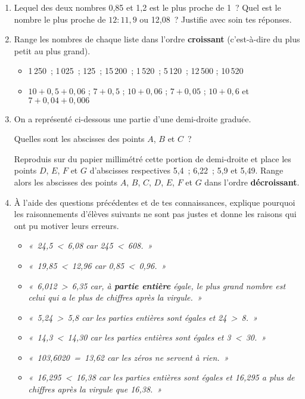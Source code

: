 

\begin{activite}

\begin{partie}
\begin{enumerate}
 \item Lequel des deux nombres 0,85 et 1,2 est le plus proche de 1 ? Quel est le nombre le plus proche de $12 : 11,9$ ou 12,08 ? Justifie avec soin tes réponses.
 \item Range les nombres de chaque liste dans l'ordre \textbf{croissant} (c'est-à-dire du plus petit au plus grand).
 	\begin{itemize}
	\item 1\,250 ; 1\,025 ; 125 ; 15\,200 ; 1\,520 ; 5\,120 ; 12\,500 ; 10\,520
	\item $10 + 0,5 + 0,06$ ; $7 + 0,5$ ; $10 + 0,06$ ; $7 + 0,05$ ; $10 + 0,6$ et $7 + 0,04 + 0,006$
	 \end{itemize}
 \item On a représenté ci-dessous une partie d'une demi-droite graduée.

Quelles sont les abscisses des points $A$, $B$ et $C$ ?

\vspace{0.75em}

Reproduis sur du papier millimétré cette portion de demi-droite et place les points $D$, $E$, $F$ et $G$ d'abscisses respectives 5,4 ; 6,22 ; 5,9 et 5,49.
Range alors les abscisses des points $A$, $B$, $C$, $D$, $E$, $F$ et $G$ dans l'ordre \textbf{décroissant}.
 \item À l'aide des questions précédentes et de tes connaissances, explique pourquoi les raisonnements d'élèves suivants ne sont pas justes et donne les raisons qui ont pu motiver leurs erreurs.
	\begin{itemize}
	\item \emph{« 24,5 < 6,08 car 245 < 608. »}
	\item \emph{« 19,85 < 12,96 car 0,85 < 0,96. »}
	\item \emph{« 6,012 > 6,35 car, à \textbf{partie entière} égale, le plus grand nombre est celui qui a le plus de chiffres après la virgule. »}
	\item \emph{« 5,24 > 5,8 car les parties entières sont égales et 24 > 8. »}
	\item \emph{« 14,3 < 14,30 car les parties entières sont égales et 3 < 30. »}
	\item \emph{« 103,6020 = 13,62 car les zéros ne servent à rien. »}
	\item \emph{« 16,295 < 16,38 car les parties entières sont égales et 16,295 a plus de chiffres après la virgule que 16,38. »}
	 \end{itemize}
 \end{enumerate}
\end{partie}


\end{activite}
